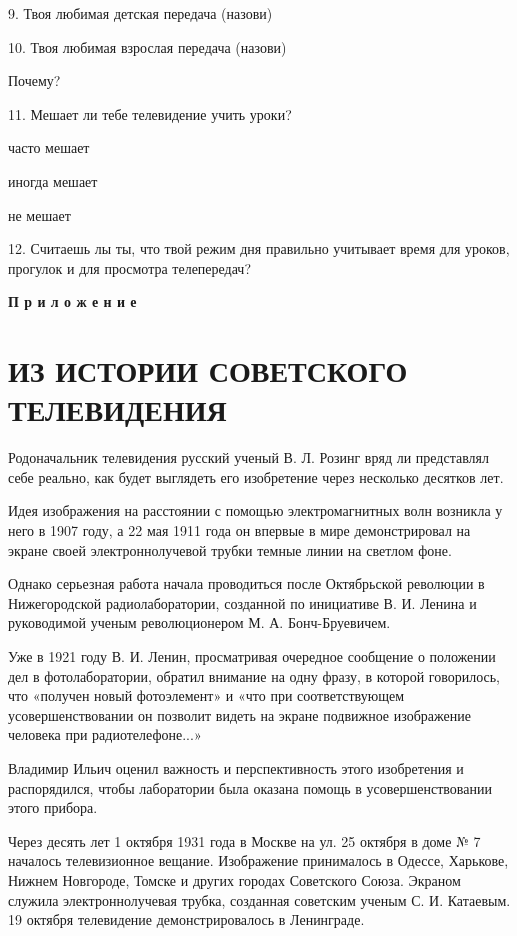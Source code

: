 \documentclass[12pt, a4paper, openany]{book}
\begin{document}
9. Твоя любимая детская передача (назови) 

10. Твоя любимая взрослая передача (назови) 

Почему? 
 
11. Мешает ли тебе телевидение учить уроки?

часто мешает 

иногда мешает 

не мешает 

12. Считаешь лы ты, что твой режим дня правильно учитывает время для уроков, прогулок и для просмотра телепередач? 


\newpage

\hspace{3cm} \textbf{П р и л о ж е н и е }

\section[Из истории советского телевидения]{\center \textbf{ИЗ ИСТОРИИ СОВЕТСКОГО ТЕЛЕВИДЕНИЯ}}

Родоначальник телевидения русский ученый В. Л. Розинг вряд ли представлял себе реально, как будет выглядеть его изобретение через несколько десятков лет. 

Идея изображения на расстоянии с помощью электромагнитных волн возникла у него в 1907 году, а 22 мая 1911 года он впервые в мире демонстрировал на экране своей электроннолучевой трубки темные линии на светлом фоне. 

Однако серьезная работа начала проводиться после Октябрьской революции в Нижегородской радиолаборатории, созданной по инициативе В. И. Ленина и руководимой ученым революционером М. А. Бонч-Бруевичем. 

Уже в 1921 году В. И. Ленин, просматривая очередное сообщение о положении дел в фотолаборатории, обратил внимание на одну фразу, в которой говорилось, что «получен новый фотоэлемент» и «что при соответствующем усовершенствовании он позволит видеть на экране подвижное изображение человека при радиотелефоне...» 

Владимир Ильич оценил важность и перспективность этого изобретения и распорядился, чтобы лаборатории была оказана помощь в усовершенствовании этого прибора. 

Через десять лет 1 октября 1931 года в Москве на ул. 25 октября в доме № 7 началось телевизионное вещание. Изображение принималось в Одессе, Харькове, Нижнем Новгороде, Томске и других городах Советского Союза. Экраном служила электроннолучевая трубка, созданная советским ученым С. И. Катаевым. 19 октября телевидение демонстрировалось в Ленинграде. 
\end{document}
